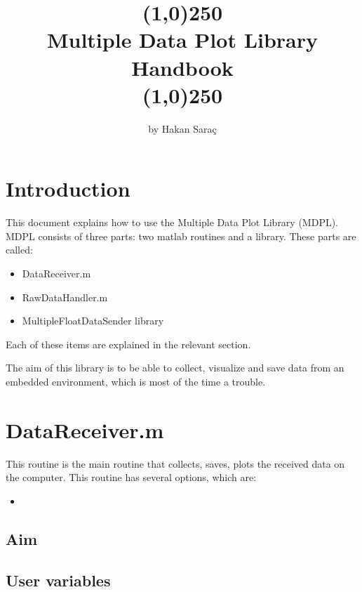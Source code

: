 \documentclass{article}
\author{by \hisfont Hakan Saraç}
\date{}
\begin{document}
\title{\line(1,0){250}\\\myfont Multiple Data Plot Library Handbook \\\line(1,0){250}}
\maketitle
\newpage
\tableofcontents
\newpage


\section{Introduction}


This document explains how to use the Multiple Data Plot Library (MDPL). MDPL consists of three parts: two matlab routines and a library. These parts are called:
\begin{itemize}
	\item DataReceiver.m
	\item RawDataHandler.m
	\item MultipleFloatDataSender library
\end{itemize}

Each of these items are explained in the relevant section.
\newline

The aim of this library is to be able to collect, visualize and save data from an embedded environment, which is most of the time a trouble. 



\section{DataReceiver.m} 
This routine is the main routine that collects, saves, plots the received data on the computer. This routine has several options, which are:
\begin{itemize}
	\item 
\end{itemize}
\subsection{Aim}
\subsection{User variables}



\end{document}
